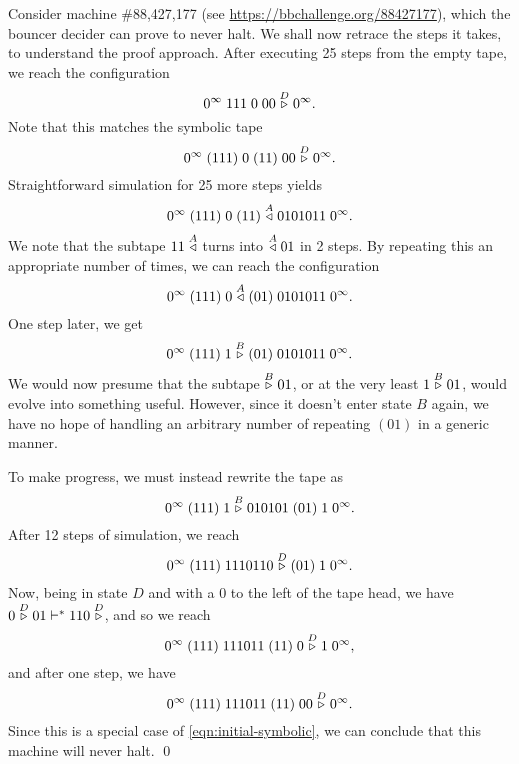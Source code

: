 \begin{example}
Consider machine \#88,427,177 (see \url{https://bbchallenge.org/88427177}),
which the bouncer decider can prove to never halt. We shall now retrace the
steps it takes, to understand the proof approach.
After executing 25 steps from the empty tape, we reach the configuration
\begin{equation}
    0^\infty\; 111\; 0\; 00 \stackrel{D}\triangleright 0^\infty.
\end{equation}
Note that this matches the symbolic tape
\begin{equation}
    \label{eqn:initial-symbolic}
    0^\infty\; (111)\; 0\; (11)\; 00 \stackrel{D}\triangleright 0^\infty.
\end{equation}
Straightforward simulation for 25 more steps yields
\begin{equation}
    0^\infty\; (111)\; 0\; (11) \stackrel{A}\triangleleft 0101011\; 0^\infty.
\end{equation}
We note that the subtape $11 \stackrel{A}\triangleleft$ turns into $\stackrel{A}\triangleleft 01$ in 2 steps. By repeating
this an appropriate number of times, we can reach the configuration
\begin{equation}
    0^\infty\; (111)\; 0 \stackrel{A}\triangleleft (01)\; 0101011\; 0^\infty.
\end{equation}
One step later, we get
\begin{equation}
    0^\infty\; (111)\; 1 \stackrel{B}\triangleright (01)\; 0101011\; 0^\infty.
\end{equation}
We would now presume that the subtape $\stackrel{B}\triangleright 01$, or at the very least $1 \stackrel{B}\triangleright 01$,
would evolve into something
useful. However, since it doesn't enter state $B$ again, we have no hope of
handling an arbitrary number of repeating $(01)$ in a generic manner.

To make progress, we must instead rewrite the tape as
\begin{equation}
    0^\infty\; (111)\; 1 \stackrel{B}\triangleright 010101\; (01)\; 1\; 0^\infty.
\end{equation}
After 12 steps of simulation, we reach
\begin{equation}
    0^\infty\; (111)\; 1110110 \stackrel{D}\triangleright (01)\; 1\; 0^\infty.
\end{equation}
Now, being in state $D$ and with a 0 to the left of the tape head, we have
$0 \stackrel{D}\triangleright 01 \vdash^* 110 \stackrel{D}\triangleright$, and so we reach
\begin{equation}
    0^\infty\; (111)\; 111011\; (11)\; 0 \stackrel{D}\triangleright 1\; 0^\infty,
\end{equation}
and after one step, we have
\begin{equation}
    0^\infty\; (111)\; 111011\; (11)\; 00 \stackrel{D}\triangleright 0^\infty.
\end{equation}
Since this is a special case of \eqref{eqn:initial-symbolic}, we can
conclude that this machine will never halt. \qed
\end{example}

